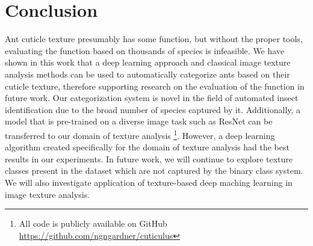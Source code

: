 \documentclass{aci}
\numberwithin{equation}{section}
\begin{document}
\section{Conclusion}
Ant cuticle texture presumably has some function, but without the proper tools,
evaluating the function based on thousands of species is infeasible. We have
shown in this work that a deep learning approach and classical image texture
analysis methods can be used to automatically categorize ants based on their
cuticle texture, therefore supporting research on the evaluation of the function
in future work. Our categorization system is novel in the field of automated
insect identification due to the broad number of species captured by it.
Additionally, a model that is pre-trained on a diverse image task such as ResNet
can be transferred to our domain of texture analysis \footnote{All code is
    publicly available on GitHub \url{https://github.com/ngngardner/cuticulus}}.
However, a deep learning algorithm created specifically for the domain of
texture analysis had the best results in our experiments. In future work, we
will continue to explore texture classes present in the dataset which are not
captured by the binary class system. We will also investigate application of
texture-based deep maching learning in image texture analysis.



\end{document}
